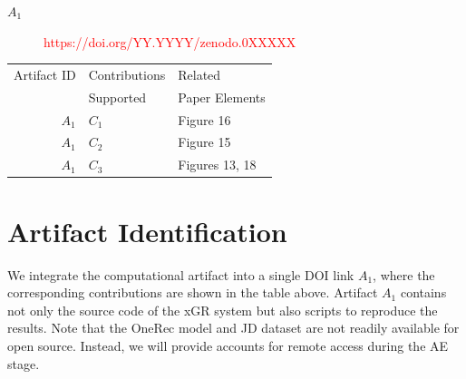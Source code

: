 \documentclass[nonacm,sigconf]{acmart}
\begin{document}
\begin{description}
\item[$A_1$] \textcolor{red}{https://doi.org/YY.YYYY/zenodo.0XXXXX}
\end{description}


\begin{center}
\begin{tabular}{rll}
\toprule
Artifact ID    & Contributions &  Related \\
              &  Supported     &  Paper Elements \\
\midrule
$A_1$   &   $C_1$ & Figure 16 \\
\midrule
$A_1$    &  $C_2$ & Figure 15 \\
\midrule
$A_1$ & $C_3$ & Figures 13, 18\\
\bottomrule
\end{tabular}
\end{center}


\section{Artifact Identification}

We integrate the computational artifact into a single DOI link $A_1$, where the corresponding contributions are shown in the table above. Artifact $A_1$ contains not only the source code of the xGR system but also scripts to reproduce the results. Note that the OneRec model and JD dataset are not readily available for open source. Instead, we will provide accounts for remote access during the AE stage.


\newartifact
\end{document}
